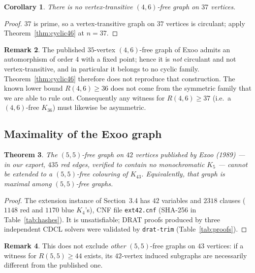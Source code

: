 \documentclass[11pt]{article}
\newtheorem{theorem}{Theorem}
\newtheorem{corollary}[theorem]{Corollary}
\theoremstyle{definition}
\newtheorem{remark}[theorem]{Remark}
\theoremstyle{plain}
\newcommand{\K}{\ensuremath{K}}
\newcommand{\R}[2]{\ensuremath{R(#1,#2)}}
\begin{document}
\begin{corollary}\label{cor:vt46}
There is no vertex-transitive $(4,6)$-free graph on $37$ vertices.
\end{corollary}

\begin{proof}
$37$ is prime, so a vertex-transitive graph on $37$ vertices is circulant;
apply Theorem~\ref{thm:cyclic46} at $n = 37$.
\end{proof}

\begin{remark}\label{rem:exoo35}
The published $35$-vertex $(4,6)$-free graph of Exoo admits an automorphism of
order $4$ with a fixed point; hence it is \emph{not} circulant and not
vertex-transitive, and in particular it belongs to no cyclic family.
Theorem~\ref{thm:cyclic46} therefore does not reproduce that construction.
The known lower bound $\R{4}{6} \ge 36$ does not come from the symmetric
family that we are able to rule out. Consequently any witness for
$\R{4}{6} \ge 37$ (i.e.\ a $(4,6)$-free $\K_{36}$) must likewise be
asymmetric.
\end{remark}

\subsection{Maximality of the Exoo graph}\label{sec:resexoo}

\begin{theorem}\label{thm:exoo}
The $(5,5)$-free graph on $42$ vertices published by Exoo (1989) --- in our
export, $435$ red edges, verified to contain no monochromatic $\K_5$ --- cannot
be extended to a $(5,5)$-free colouring of $\K_{43}$. Equivalently, that graph
is maximal among $(5,5)$-free graphs.
\end{theorem}

\begin{proof}
The extension instance of Section~3.4 has $42$ variables and $2318$ clauses
($1148$ red and $1170$ blue $\K_4$'s), CNF file
\texttt{ext42.cnf} (SHA-256 in Table~\ref{tab:hashes}). It is unsatisfiable;
DRAT proofs produced by three independent CDCL solvers were validated by
\texttt{drat-trim} (Table~\ref{tab:proofs}).
\end{proof}

\begin{remark}
This does not exclude \emph{other} $(5,5)$-free graphs on $43$ vertices: if a
witness for $\R{5}{5} \ge 44$ exists, its $42$-vertex induced subgraphs are
necessarily different from the published one.
\end{remark}
\end{document}
